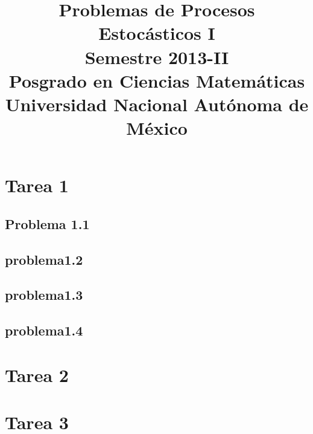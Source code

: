 \documentclass[a5paper,oneside]{amsart}
\title[Problemas de Procesos I]{Problemas de Procesos Estocásticos I\\ Semestre 2013-II\\ Posgrado en Ciencias Matemáticas\\ Universidad Nacional Autónoma de México}
\theoremstyle{dotless}
\begin{document}
	\maketitle
	\section{Tarea 1}
	\nqed
		\subsection{Problema 1.1}
		
		
		\subsection{problema1.2}
		
		
		\subsection{problema1.3}
		
		
		\subsection{problema1.4}
		
		\nqed
		
	\section{Tarea 2}

		
		\nqed
		
	\section{Tarea 3}

		

		
	
	
\end{document}
